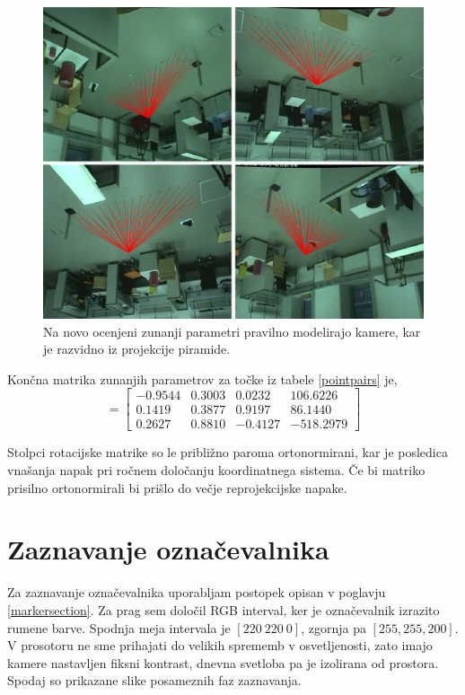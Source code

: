 \documentclass[a4paper, 12pt]{book}
\begin{document}
\begin{figure}[H]
\centering
\includegraphics[scale=0.25]{reprojection_corrected.png}
\caption{Na novo ocenjeni zunanji parametri pravilno modelirajo kamere, kar je razvidno iz projekcije piramide.}
\end{figure}

Končna matrika zunanjih parametrov za točke iz tabele \ref{pointpairs} je,
\begin{equation}
[R|\vec{T}] = 
\begin{bmatrix}
-0.9544 & 0.3003 & 0.0232 & 106.6226 \\
0.1419 & 0.3877 & 0.9197 & 86.1440 \\
0.2627 & 0.8810 & -0.4127 & -518.2979 
\end{bmatrix}
\end{equation}

Stolpci rotacijske matrike so le približno paroma ortonormirani, kar je posledica vnašanja napak pri ročnem določanju koordinatnega sistema. Če bi matriko prisilno ortonormirali bi prišlo do večje reprojekcijske napake. 

\section{Zaznavanje označevalnika}
Za zaznavanje označevalnika uporabljam postopek opisan v poglavju \ref{markersection}. Za prag sem določil RGB interval, ker je označevalnik izrazito rumene barve. Spodnja meja intervala je $[220 \ 220 \ 0]$, zgornja pa $[255, 255, 200]$. V prosotoru ne sme prihajati do velikih sprememb v osvetljenosti, zato imajo kamere nastavljen fiksni kontrast, dnevna svetloba pa je izolirana od prostora. Spodaj so prikazane slike posameznih faz zaznavanja.
\end{document}
